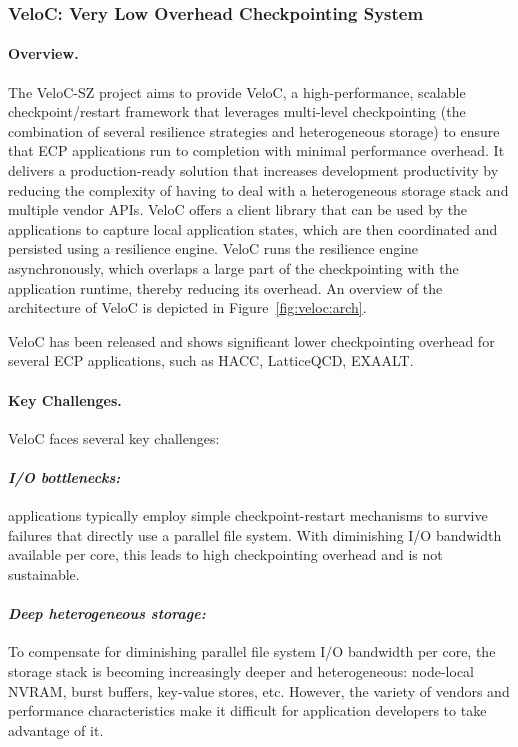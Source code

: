 \subsubsection{ VeloC: Very Low Overhead Checkpointing System}

\paragraph{Overview.}
The VeloC-SZ project aims to provide VeloC, a high-performance,
scalable checkpoint/restart framework that leverages multi-level
checkpointing (the combination of several resilience strategies and
heterogeneous storage) to ensure that ECP applications run to
completion with minimal performance overhead. It delivers a
production-ready solution that increases development productivity by
reducing the complexity of having to deal with a heterogeneous storage
stack and multiple vendor APIs. VeloC offers a client library that can
be used by the applications to capture local application states, which
are then coordinated and persisted using a resilience engine.  VeloC
runs the resilience engine asynchronously, which overlaps a large part
of the checkpointing with the application runtime, thereby reducing
its overhead. An overview of the architecture of VeloC is depicted
in Figure~\ref{fig:veloc:arch}.

VeloC has been released and shows significant lower checkpointing
overhead for several ECP applications, such as HACC, LatticeQCD,
EXAALT. 

\paragraph{Key Challenges.}
VeloC faces several key challenges:
\vspace{-1em}

\paragraph{\emph{I/O bottlenecks:}} applications typically employ
simple checkpoint-restart mechanisms to survive failures that directly
use a parallel file system. With diminishing I/O bandwidth available
per core, this leads to high checkpointing overhead and is not
sustainable.
\vspace{-1em}

\paragraph{\emph{Deep heterogeneous storage:}} To compensate for
diminishing parallel file system I/O bandwidth per core, the storage
stack is becoming increasingly deeper and heterogeneous: node-local
NVRAM, burst buffers, key-value stores, etc. However, the variety of
vendors and performance characteristics make it difficult for
application developers to take advantage of it.
\vspace{-1em}

